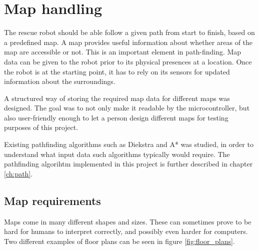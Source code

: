 





\chapter{Map handling}
\label{ch:map} %
The rescue robot should be able follow a given path from start to finish, based on a predefined map.
A map provides useful information about whether areas of the map are accessible or not. This is an important element in path-finding. Map data can be given to the robot prior to its physical presences at a location. Once the robot is at the starting point, it has to rely on its sensors for updated information about the surroundings.

A structured way of storing the required map data for different maps was designed. 
The goal was to not only make it readable by the microcontroller, 
but also user-friendly enough to let a person design different maps for testing purposes of this project.

Existing pathfinding algorithms such as Diekstra and A* was studied, 
in order to understand what input data such algorithms typically would require. 
The pathfinding algorihtm implemented in this project is further described in chapter \ref{ch:path}. 
\newpage

\section{Map requirements}
\label{ch:map_requirements}
Maps come in many different shapes and sizes. 
These can sometimes prove to be hard for humans to interpret correctly, and possibly even harder for computers.
Two different examples of floor plans can be seen in figure \ref{fig:floor_plans}.

